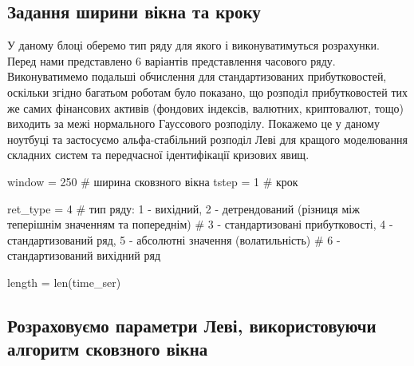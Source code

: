 \documentclass[
  letterpaper,
]{report}
\newenvironment{Shaded}{\begin{snugshade}}{\end{snugshade}}
\newcommand{\BuiltInTok}[1]{\textcolor[rgb]{0.00,0.23,0.31}{#1}}
\newcommand{\CommentTok}[1]{\textcolor[rgb]{0.37,0.37,0.37}{#1}}
\newcommand{\DecValTok}[1]{\textcolor[rgb]{0.68,0.00,0.00}{#1}}
\newcommand{\NormalTok}[1]{\textcolor[rgb]{0.00,0.23,0.31}{#1}}
\newcommand{\OperatorTok}[1]{\textcolor[rgb]{0.37,0.37,0.37}{#1}}
\begin{document}
\hypertarget{ux437ux430ux434ux430ux43dux43dux44f-ux448ux438ux440ux438ux43dux438-ux432ux456ux43aux43dux430-ux442ux430-ux43aux440ux43eux43aux443-1}{%
\subsection{Задання ширини вікна та
кроку}\label{ux437ux430ux434ux430ux43dux43dux44f-ux448ux438ux440ux438ux43dux438-ux432ux456ux43aux43dux430-ux442ux430-ux43aux440ux43eux43aux443-1}}

У даному блоці оберемо тип ряду для якого і виконуватимуться розрахунки.
Перед нами представлено 6 варіантів представлення часового ряду.
Виконуватимемо подальші обчислення для стандартизованих прибутковостей,
оскільки згідно багатьом роботам було показано, що розподіл
прибутковостей тих же самих фінансових активів (фондових індексів,
валютних, криптовалют, тощо) виходить за межі нормального Гауссового
розподілу. Покажемо це у даному ноутбуці та застосуємо альфа-стабільний
розподіл Леві для кращого моделювання складних систем та передчасної
ідентифікації кризових явищ.

\begin{Shaded}
\begin{Highlighting}[]
\NormalTok{window }\OperatorTok{=} \DecValTok{250} \CommentTok{\# ширина сковзного вікна}
\NormalTok{tstep }\OperatorTok{=} \DecValTok{1} \CommentTok{\# крок}

\NormalTok{ret\_type }\OperatorTok{=} \DecValTok{4} \CommentTok{\# тип ряду: 1 {-} вихідний, 2 {-} детрендований (різниця між теперішнім значенням та попереднім)}
                        \CommentTok{\# 3 {-} стандартизовані прибутковості, 4 {-} стандартизований ряд, 5 {-} абсолютні значення (волатильність)}
                        \CommentTok{\# 6 {-} стандартизований вихідний ряд}
        
\NormalTok{length }\OperatorTok{=} \BuiltInTok{len}\NormalTok{(time\_ser)}
\end{Highlighting}
\end{Shaded}

\hypertarget{ux440ux43eux437ux440ux430ux445ux43eux432ux443ux454ux43cux43e-ux43fux430ux440ux430ux43cux435ux442ux440ux438-ux43bux435ux432ux456-ux432ux438ux43aux43eux440ux438ux441ux442ux43eux432ux443ux44eux447ux438-ux430ux43bux433ux43eux440ux438ux442ux43c-ux441ux43aux43eux432ux437ux43dux43eux433ux43e-ux432ux456ux43aux43dux430}{%
\subsection{Розраховуємо параметри Леві, використовуючи алгоритм
сковзного
вікна}\label{ux440ux43eux437ux440ux430ux445ux43eux432ux443ux454ux43cux43e-ux43fux430ux440ux430ux43cux435ux442ux440ux438-ux43bux435ux432ux456-ux432ux438ux43aux43eux440ux438ux441ux442ux43eux432ux443ux44eux447ux438-ux430ux43bux433ux43eux440ux438ux442ux43c-ux441ux43aux43eux432ux437ux43dux43eux433ux43e-ux432ux456ux43aux43dux430}}
\end{document}

